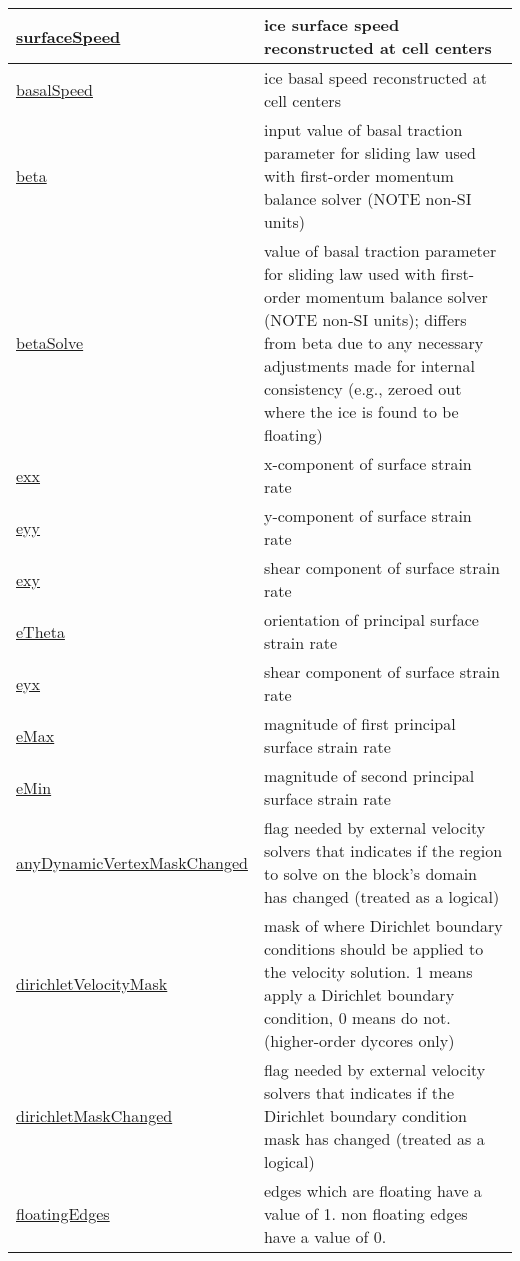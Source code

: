 {\begin{center}
\begin{longtable}{| p{2.0in} | p{4.0in} |}
    \hyperref[subsec:var_sec_velocity_surfaceSpeed]{surfaceSpeed} & ice surface speed reconstructed at cell centers \\
    \hline
    \hyperref[subsec:var_sec_velocity_basalSpeed]{basalSpeed} & ice basal speed reconstructed at cell centers \\
    \hline
    \hyperref[subsec:var_sec_velocity_beta]{beta} & input value of basal traction parameter for sliding law used with first-order momentum balance solver (NOTE non-SI units) \\
    \hline
    \hyperref[subsec:var_sec_velocity_betaSolve]{betaSolve} & value of basal traction parameter for sliding law used with first-order momentum balance solver (NOTE non-SI units); differs from beta due to any necessary adjustments made for internal consistency (e.g., zeroed out where the ice is found to be floating) \\
    \hline
    \hyperref[subsec:var_sec_velocity_exx]{exx} & x-component of surface strain rate \\
    \hline
    \hyperref[subsec:var_sec_velocity_eyy]{eyy} & y-component of surface strain rate \\
    \hline
    \hyperref[subsec:var_sec_velocity_exy]{exy} & shear component of surface strain rate \\
    \hline
    \hyperref[subsec:var_sec_velocity_eTheta]{eTheta} & orientation of principal surface strain rate \\
    \hline
    \hyperref[subsec:var_sec_velocity_eyx]{eyx} & shear component of surface strain rate \\
    \hline
    \hyperref[subsec:var_sec_velocity_eMax]{eMax} & magnitude of first principal surface strain rate \\
    \hline
    \hyperref[subsec:var_sec_velocity_eMin]{eMin} & magnitude of second principal surface strain rate \\
    \hline
    \hyperref[subsec:var_sec_velocity_anyDynamicVertexMaskChanged]{anyDynamicVertexMaskChanged} & flag needed by external velocity solvers that indicates if the region to solve on the block's domain has changed (treated as a logical) \\
    \hline
    \hyperref[subsec:var_sec_velocity_dirichletVelocityMask]{dirichletVelocityMask} & mask of where Dirichlet boundary conditions should be applied to the velocity solution.  1 means apply a Dirichlet boundary condition, 0 means do not. (higher-order dycores only) \\
    \hline
    \hyperref[subsec:var_sec_velocity_dirichletMaskChanged]{dirichletMaskChanged} & flag needed by external velocity solvers that indicates if the Dirichlet boundary condition mask has changed (treated as a logical) \\
    \hline
    \hyperref[subsec:var_sec_velocity_floatingEdges]{floatingEdges} & edges which are floating have a value of 1.  non floating edges have a value of 0. \\
    \hline
\end{longtable}
\end{center}
}
